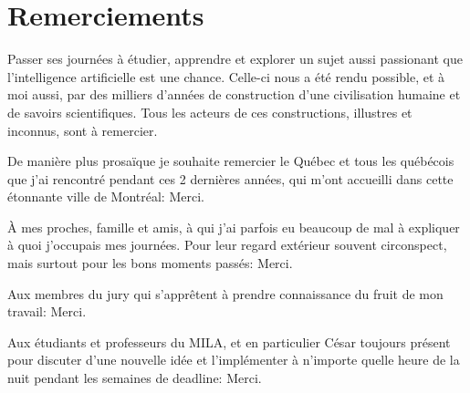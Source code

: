 \documentclass[12pt,maitrise,nobabel,anglais,twoside,initial]{template/dms}
\numberwithin{equation}{section}
\numberwithin{table}{chapter}
\numberwithin{figure}{chapter}
\begin{document}


\chapter*{Remerciements} %

Passer ses journées à étudier, apprendre et explorer un sujet aussi passionant que l'intelligence artificielle est une chance. Celle-ci nous a été rendu possible, et à moi aussi, par des milliers d'années de construction d'une civilisation humaine et de savoirs scientifiques. Tous les acteurs de ces constructions, illustres et inconnus, sont à remercier. 

De manière plus prosaïque je souhaite remercier le Québec et tous les québécois que j'ai rencontré pendant ces 2 dernières années, qui m'ont accueilli dans cette étonnante ville de Montréal: Merci. 

À mes proches, famille et amis, à qui j'ai parfois eu beaucoup de mal à expliquer à quoi j'occupais mes journées. Pour leur regard extérieur souvent circonspect, mais surtout pour les bons moments passés: Merci.

Aux membres du jury qui s'apprêtent à prendre connaissance du fruit de mon travail: Merci.

Aux étudiants et professeurs du MILA, et en particulier César toujours présent pour discuter d'une nouvelle idée et l'implémenter à n'importe quelle heure de la nuit pendant les semaines de deadline: Merci. 
\end{document}
